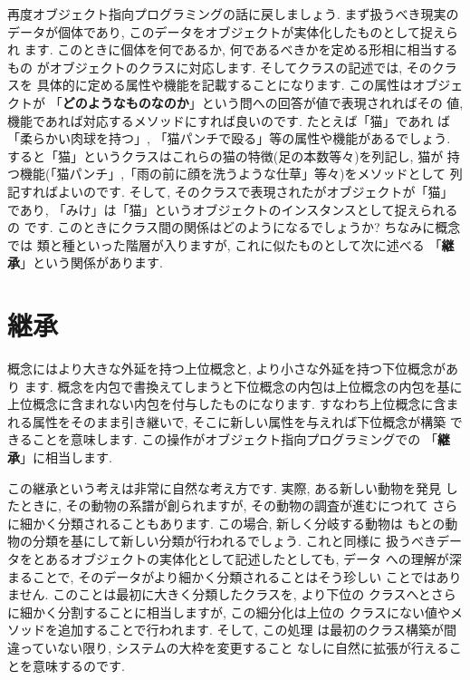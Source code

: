 \documentclass[b5j,8pt,twocolumn]{ltjsarticle}
\begin{document}
再度オブジェクト指向プログラミングの話に戻しましょう. まず扱うべき現実の
データが個体であり, このデータをオブジェクトが実体化したものとして捉えられ
ます. このときに個体を何であるか, 何であるべきかを定める形相に相当するもの
がオブジェクトのクラスに対応します. そしてクラスの記述では, そのクラスを
具体的に定める属性や機能を記載することになります. この属性はオブジェクトが
「\textbf{どのようなものなのか}」という問への回答が値で表現されればその
値,  機能であれば対応するメソッドにすれば良いのです. たとえば「猫」であれ
ば「柔らかい肉球を持つ」, 「猫パンチで殴る」等の属性や機能があるでしょう.
 すると「猫」というクラスはこれらの猫の特徴(足の本数等々)を列記し, 猫が
持つ機能(「猫パンチ」,「雨の前に顔を洗うような仕草」等々)をメソッドとして
列記すればよいのです. そして, そのクラスで表現されたがオブジェクトが「猫」
であり, 「みけ」は「猫」というオブジェクトのインスタンスとして捉えられるの
です. このときにクラス間の関係はどのようになるでしょうか? ちなみに概念では
類と種といった階層が入りますが, これに似たものとして次に述べる
「\textbf{継承}」という関係があります.


\section{継承}


概念にはより大きな外延を持つ上位概念と, より小さな外延を持つ下位概念があり
ます. 概念を内包で書換えてしまうと下位概念の内包は上位概念の内包を基に
上位概念に含まれない内包を付与したものになります. すなわち上位概念に含ま
れる属性をそのまま引き継いで, そこに新しい属性を与えれば下位概念が構築
できることを意味します. この操作がオブジェクト指向プログラミングでの
「\textbf{継承}」に相当します.
\newline


この継承という考えは非常に自然な考え方です. 実際, ある新しい動物を発見
したときに, その動物の系譜が創られますが, その動物の調査が進むにつれて
さらに細かく分類されることもあります. この場合, 新しく分岐する動物は
もとの動物の分類を基にして新しい分類が行われるでしょう. これと同様に
扱うべきデータをとあるオブジェクトの実体化として記述したとしても, データ
への理解が深まることで, そのデータがより細かく分類されることはそう珍しい
ことではありません. このことは最初に大きく分類したクラスを, より下位の
クラスへとさらに細かく分割することに相当しますが, この細分化は上位の
クラスにない値やメソッドを追加することで行われます. そして, この処理
は最初のクラス構築が間違っていない限り, システムの大枠を変更すること
なしに自然に拡張が行えることを意味するのです.
\newline
\end{document}
